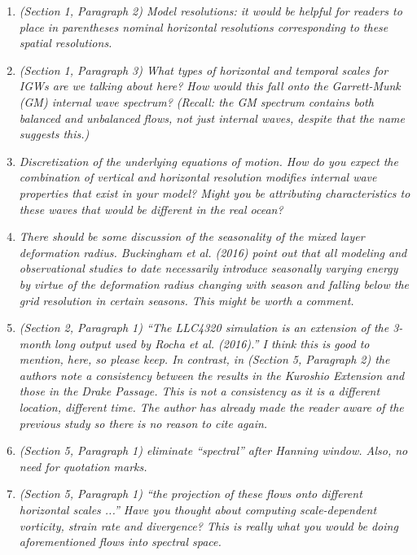\documentclass[11pt]{article}
\begin{document}
\begin{enumerate}
  \item {\it (Section 1, Paragraph 2) Model resolutions: it would be helpful for readers to place in
        parentheses nominal horizontal resolutions corresponding to these spatial resolutions.}

  \item {\it (Section 1, Paragraph 3) What types of horizontal and temporal scales for IGWs are
        we talking about here? How would this fall onto the Garrett-Munk (GM) internal
        wave spectrum? (Recall: the GM spectrum contains both balanced and unbalanced
        flows, not just internal waves, despite that the name suggests this.)}

 \item {\it Discretization of the underlying equations of motion. How do you expect the
        combination of vertical and horizontal resolution modifies internal wave properties
        that exist in your model? Might you be attributing characteristics to these waves that
        would be different in the real ocean?}

\item {\it There should be some discussion of the seasonality of the mixed layer deformation
      radius. Buckingham et al. (2016) point out that all modeling and observational studies
      to date necessarily introduce seasonally varying energy by virtue of the deformation
      radius changing with season and falling below the grid resolution in certain seasons.
      This might be worth a comment.}

\item {\it (Section 2, Paragraph 1) ``The LLC4320 simulation is an extension of the 3-month
      long output used by Rocha et al. (2016).'' I think this is good to mention, here, so
      please keep. In contrast, in (Section 5, Paragraph 2) the authors note a consistency
      between the results in the Kuroshio Extension and those in the Drake Passage. This is
      not a consistency as it is a different location, different time. The author has already
      made the reader aware of the previous study so there is no reason to cite again.}

\item {\it (Section 5, Paragraph 1) eliminate ``spectral'' after Hanning window. Also, no need for
        quotation marks.}

\item {\it (Section 5, Paragraph 1) ``the projection of these flows onto different horizontal scales
            ...'' Have you thought about computing scale-dependent vorticity, strain rate and
            divergence? This is really what you would be doing
            aforementioned flows into spectral space.}


\end{enumerate}
\end{document}
